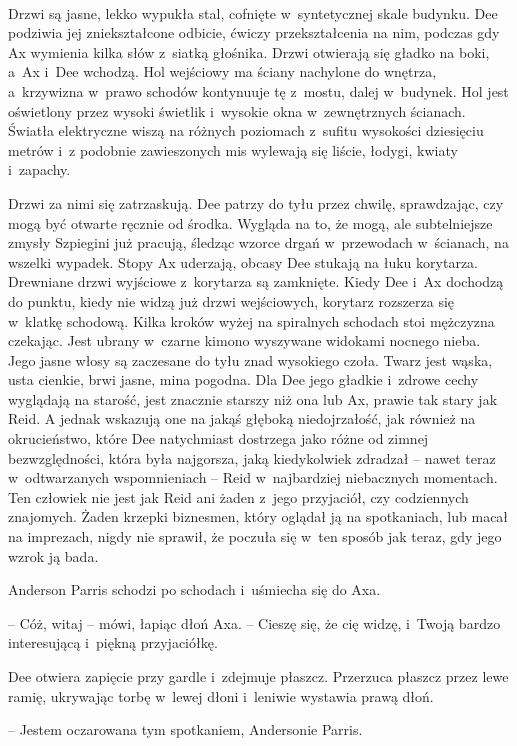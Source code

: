\documentclass[oneside,polish,11pt,sfheadings]{mwbk}
\begin{document}
~

Drzwi są jasne, lekko wypukła stal, cofnięte w~syntetycznej skale
budynku. Dee podziwia jej zniekształcone odbicie, ćwiczy przekształcenia
na nim, podczas gdy Ax wymienia kilka słów z~siatką głośnika. Drzwi
otwierają się gładko na boki, a~Ax i~Dee wchodzą. Hol wejściowy ma
ściany nachylone do wnętrza, a~krzywizna w~prawo schodów kontynuuje tę z~mostu, dalej w~budynek. Hol jest oświetlony przez wysoki świetlik i~wysokie okna w~zewnętrznych ścianach. Światła elektryczne wiszą na
różnych poziomach z~sufitu wysokości dziesięciu metrów i~z podobnie
zawieszonych mis wylewają się liście, łodygi, kwiaty i~zapachy.

Drzwi za nimi się zatrzaskują. Dee patrzy do tyłu przez chwilę,
sprawdzając, czy mogą być otwarte ręcznie od środka. Wygląda na to, że
mogą, ale subtelniejsze zmysły Szpiegini już pracują, śledząc wzorce
drgań w~przewodach w~ścianach, na wszelki wypadek. Stopy Ax uderzają,
obcasy Dee stukają na łuku korytarza. Drewniane drzwi wyjściowe z~korytarza są zamknięte. Kiedy Dee i~Ax dochodzą do punktu, kiedy nie
widzą już drzwi wejściowych, korytarz rozszerza się w~klatkę schodową.
Kilka kroków wyżej na spiralnych schodach stoi mężczyzna czekając. Jest
ubrany w~czarne kimono wyszywane widokami nocnego nieba. Jego jasne
włosy są zaczesane do tyłu znad wysokiego czoła. Twarz jest wąska, usta
cienkie, brwi jasne, mina pogodna. Dla Dee jego gładkie i~zdrowe cechy
wyglądają na starość, jest znacznie starszy niż ona lub Ax, prawie tak
stary jak Reid. A jednak wskazują one na jakąś głęboką niedojrzałość,
jak również na okrucieństwo, które Dee natychmiast dostrzega jako różne
od zimnej bezwzględności, która była najgorsza, jaką kiedykolwiek
zdradzał -- nawet teraz w~odtwarzanych wspomnieniach -- Reid w~najbardziej
niebacznych momentach. Ten człowiek nie jest jak Reid ani żaden z~jego
przyjaciół, czy codziennych znajomych. Żaden krzepki biznesmen, który
oglądał ją na spotkaniach, lub macał na imprezach, nigdy nie sprawił, że
poczuła się w~ten sposób jak teraz, gdy jego wzrok ją bada.

Anderson Parris schodzi po schodach i~uśmiecha się do Axa.

-- Cóż, witaj -- mówi, łapiąc dłoń Axa. -- Cieszę się, że cię widzę, i~Twoją bardzo interesującą i~piękną przyjaciółkę.

Dee otwiera zapięcie przy gardle i~zdejmuje płaszcz. Przerzuca płaszcz
przez lewe ramię, ukrywając torbę w~lewej dłoni i~leniwie wystawia prawą
dłoń.

-- Jestem oczarowana tym spotkaniem, Andersonie Parris.
\end{document}
